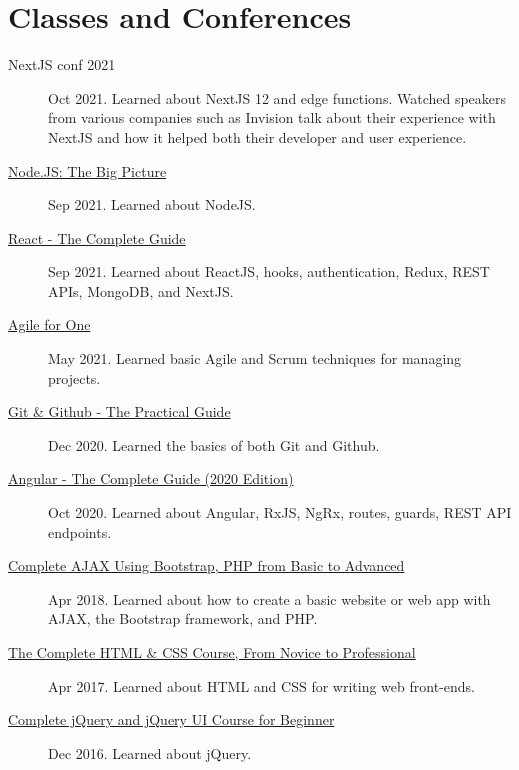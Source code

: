 \documentclass{article}
\begin{document}
\section{Classes and Conferences}

\begin{description}
  \item[NextJS conf 2021] Oct 2021. Learned about NextJS 12 and edge functions. Watched speakers from various companies such as Invision talk about their experience with NextJS and how it helped both their developer and user experience.
  \item[\href{https://sirkoik.github.io/CurriculumVitae/certifications/Nodejs-The-Big-Picture/certificate.pdf}{Node.JS: The Big Picture}] Sep 2021. Learned about NodeJS.
  \item[\href{https://www.udemy.com/certificate/UC-2196f0cf-2dce-4a11-9d8e-421827506ad1/}{React - The Complete Guide}] Sep 2021. Learned about ReactJS, hooks, authentication, Redux, REST APIs, MongoDB, and NextJS.
  \item[\href{https://sirkoik.github.io/CurriculumVitae/certifications/Agile-for-One/certificate.pdf}{Agile for One}] May 2021. Learned basic Agile and Scrum techniques for managing projects.
  \item[\href{https://sirkoik.github.io/CurriculumVitae/certifications/certificate-of-completion-for-git-github-the-practical-guide.pdf}{Git \& Github - The Practical Guide}] Dec 2020. Learned the basics of both Git and Github.
  \item[\href{https://www.udemy.com/certificate/UC-624f6f83-940e-428f-accd-d16113661ded}{Angular - The Complete Guide (2020 Edition)}] Oct 2020. Learned about Angular, RxJS, NgRx, routes, guards, REST API endpoints.
  \item[\href{https://www.udemy.com/certificate/UC-E3EMJE4O}{Complete AJAX Using Bootstrap, PHP from Basic to Advanced}] Apr 2018. Learned about how to create a basic website or web app with AJAX, the Bootstrap framework, and PHP.
  \item[\href{https://www.udemy.com/certificate/UC-QZDWYX3V}{The Complete HTML \& CSS Course, From Novice to Professional}] Apr 2017. Learned about HTML and CSS for writing web front-ends.
  \item[\href{https://www.udemy.com/certificate/UC-4V285L2N}{Complete jQuery and jQuery UI Course for Beginner}] Dec 2016. Learned about jQuery.
\end{description}
\end{document}

